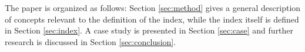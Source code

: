 The paper is organized as follows: Section \ref{sec:method} gives a general description of concepts relevant to the definition of the index, while the index itself is defined in Section \ref{sec:index}. A case study is presented in Section \ref{sec:case} and further research is discussed in Section \ref{sec:conclusion}.

